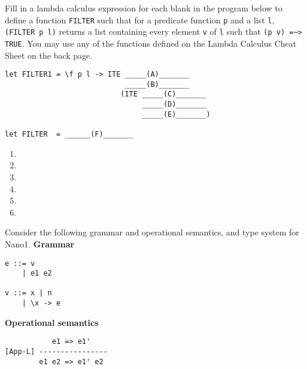 \documentclass[paper=letter, fontsize=13pt]{article} %
\numberwithin{equation}{section} %
\newif\ifshowanswers\showanswersfalse
\begin{document}
\begin{enumerate}
Fill in a lambda calculus expression for each blank in the program
below to define a function \texttt{FILTER} such that for a predicate function \texttt{p} and a list \texttt{l},
\texttt{(FILTER p l)} returns a list containing every element \texttt{v} of \texttt{l} such that \verb|(p v) =~> TRUE|.
You may use any of the functions defined on the Lambda Calculus Cheat Sheet on the back page. 

\ifshowanswers
\begin{verbatim}
let FILTER1 = \f p l -> ITE (EMPTY l)
                          FALSE
                          ITE (p (FST l))
                            (PAIR (FST l) (f p (SND l)))
                            (f p (SND l))
                      
let FILTER  = FIX FILTER1
\end{verbatim}
\else
\begin{verbatim}
let FILTER1 = \f p l -> ITE _____(A)_______
                            _____(B)_______
                           (ITE _____(C)_______
                                _____(D)_______
                                _____(E)_______)
                               
let FILTER  = ______(F)_______
\end{verbatim}
\fi

\begin{enumerate}[label=(\Alph*)]
   \item \bigskip \bigskip
   \item \bigskip \bigskip
   \item \bigskip \bigskip
   \item \bigskip \bigskip
   \item \bigskip \bigskip
   \item \bigskip \bigskip
\end{enumerate}

\newpage
{}

Consider the following grammar and operational semantics, and type system for Nano1.
{\Large \textbf{Grammar}}
\begin{lstlisting}
e ::= v 
    | e1 e2

v ::= x | n  
    | \x -> e       
\end{lstlisting}

{\Large \textbf{Operational semantics}}
\begin{verbatim}
           e1 => e1'
[App-L] ----------------
        e1 e2 => e1' e2
        

\end{verbatim}
\end{enumerate}
\end{document}
